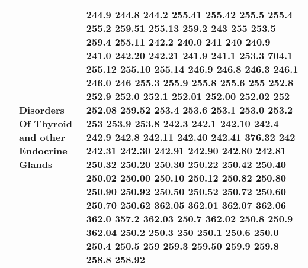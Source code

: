 \begin{longtable}{|L{.1in}|L{.6in}||L{5.65in}|}
   & Disorders Of Thyroid and other Endocrine Glands &  244.9 244.8 244.2 255.41 255.42 255.5 255.4 255.2 259.51 255.13 259.2 243 255 253.5 259.4 255.11 242.2 240.0 241 240 240.9 241.0 242.20 242.21 241.9 241.1 253.3 704.1 255.12 255.10 255.14 246.9 246.8 246.3 246.1 246.0 246 255.3 255.9 255.8 255.6 255 252.8 252.9 252.0 252.1 252.01 252.00 252.02 252 252.08 259.52 253.4 253.6 253.1 253.0 253.2 253 253.9 253.8 242.3 242.1 242.10 242.4 242.9 242.8 242.11 242.40 242.41 376.32 242 242.31 242.30 242.91 242.90 242.80 242.81 250.32 250.20 250.30 250.22 250.42 250.40 250.02 250.00 250.10 250.12 250.82 250.80 250.90 250.92 250.50 250.52 250.72 250.60 250.70 250.62 362.05 362.01 362.07 362.06 362.0 357.2 362.03 250.7 362.02 250.8 250.9 362.04 250.2 250.3 250 250.1 250.6 250.0 250.4 250.5 259 259.3 259.50 259.9 259.8 258.8 258.92\\\hline

\end{longtable}
